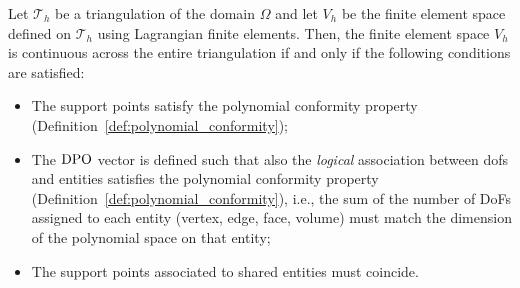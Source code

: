\begin{theorem}
\label{thm:continuity_lagrange}
  Let $\mathcal{T}_h$ be a triangulation of the domain $\Omega$ and let $V_h$ be the finite element space defined on $\mathcal{T}_h$ using Lagrangian finite elements. Then, the finite element space $V_h$ is continuous across the entire triangulation if and only if the following conditions are satisfied:
  \begin{itemize}
    \item The support points satisfy the polynomial conformity property (Definition~\ref{def:polynomial_conformity});
    \item The $\mathrm{DPO}$ vector is defined such that also the \emph{logical} association between dofs and entities satisfies the polynomial conformity property (Definition~\ref{def:polynomial_conformity}), i.e., the sum of the number of DoFs assigned to each entity (vertex, edge, face, volume) must match the dimension of the polynomial space on that entity;
    \item The support points associated to shared entities must coincide.
  \end{itemize}
\end{theorem}
